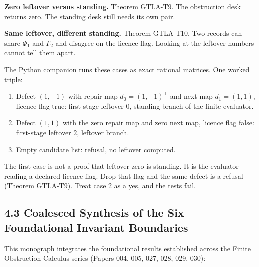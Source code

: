 \documentclass[
  11pt,
]{article}
\providecommand{\tightlist}{%
  \setlength{\itemsep}{0pt}\setlength{\parskip}{0pt}}
\begin{document}
\textbf{Zero leftover versus standing.} Theorem GTLA-T9. The obstruction desk returns zero. The standing desk still needs its own pair.

\textbf{Same leftover, different standing.} Theorem GTLA-T10. Two records can share \(\Phi_1\) and \(\Gamma_2\) and disagree on the licence flag. Looking at the leftover numbers cannot tell them apart.

The Python companion runs these cases as exact rational matrices. One worked triple:

\begin{enumerate}
\def\labelenumi{\arabic{enumi}.}
\tightlist
\item
  Defect \((1,-1)\) with repair map \(d_0=(1,-1)^\top\) and next map \(d_1=(1,1)\), licence flag true: first-stage leftover \(0\), standing branch of the finite evaluator.
\item
  Defect \((1,1)\) with the zero repair map and zero next map, licence flag false: first-stage leftover \(2\), leftover branch.
\item
  Empty candidate list: refusal, no leftover computed.
\end{enumerate}

The first case is not a proof that leftover zero is standing. It is the evaluator reading a declared licence flag. Drop that flag and the same defect is a refusal (Theorem GTLA-T9). Treat case 2 as a yes, and the tests fail.

\subsection{4.3 Coalesced Synthesis of the Six Foundational Invariant Boundaries}\label{coalesced-synthesis-of-the-six-foundational-invariant-boundaries}

This monograph integrates the foundational results established across the Finite Obstruction Calculus series (Papers 004, 005, 027, 028, 029, 030):
\end{document}
